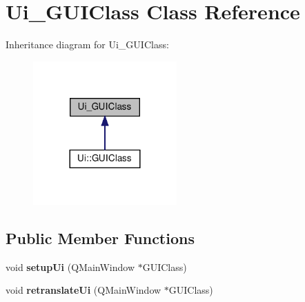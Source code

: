 \hypertarget{classUi__GUIClass}{}\section{Ui\+\_\+\+G\+U\+I\+Class Class Reference}
\label{classUi__GUIClass}


Inheritance diagram for Ui\+\_\+\+G\+U\+I\+Class\+:
\nopagebreak
\begin{figure}[H]
\begin{center}
\leavevmode
\includegraphics[width=156pt]{classUi__GUIClass__inherit__graph}
\end{center}
\end{figure}
\subsection*{Public Member Functions}
\begin{DoxyCompactItemize}
\item 
\mbox{\label{classUi__GUIClass_a81ab1a446b71bd28a4bd7a7c78fe8e9f}} 
void {\bfseries setup\+Ui} (Q\+Main\+Window $\ast$G\+U\+I\+Class)
\item 
\mbox{\label{classUi__GUIClass_adb316b97c3459c7335479a71bbebd9de}} 
void {\bfseries retranslate\+Ui} (Q\+Main\+Window $\ast$G\+U\+I\+Class)
\end{DoxyCompactItemize}
